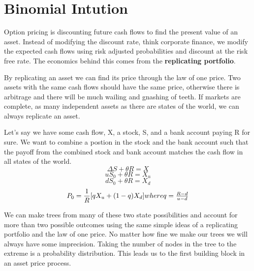 
\section{Binomial Intution}

Option pricing is discounting future cash flows to find the present value of an
asset. Instead of modifying the discount rate, think corporate finance, we
modify the expected cash flows using risk adjusted probabilities and discount
at the risk free rate. The economics behind this comes from the
\textbf{replicating portfolio}.

By replicating an asset we can find its price through the law
of one price. Two assets with the same cash flows should have the same
price, otherwise there is arbitrage and there will be much wailing and gnashing
of teeth. If markets are complete, as many independent assets as there
are states of the world, we can always replicate an asset.

Let's say we have some cash flow, X, a stock, S, and a bank account paying R
for sure. We want to combine a postion in the stock and the bank account such
that the payoff from the combined stock and bank account matches the cash flow
in all states of the world.
\[\Delta S+\theta R=X\]
\[uS_0+\theta R=X_u\]
\[dS_0+\theta R=X_d\]
\[P_0=\frac{1}{R}[qX_u+(1-q)X_d]$$ where $$ q=\frac{R-d}{u-d}\]

We can make trees from many of these two state possibilities and account for
more than two possible outcomes using the same simple ideas of a replicating
portfolio and the law of one price. No matter how fine we make our trees we
will always have some imprecision. Taking the number of nodes in the tree to
the extreme is a probability distribution. This leads us to the first building
block in an asset price process.
